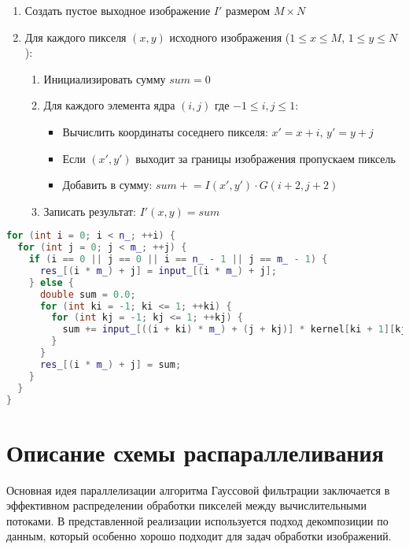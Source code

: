 \documentclass[a4paper,12pt]{article}
\begin{document}
\begin{enumerate}
    \item Создать пустое выходное изображение $I'$ размером $M \times N$
    
    \item Для каждого пикселя $(x,y)$ исходного изображения ($1 \leq x \leq M$, $1 \leq y \leq N$):
    \begin{enumerate}
        \item Инициализировать сумму $sum = 0$
        
        \item Для каждого элемента ядра $(i,j)$ где $-1 \leq i,j \leq 1$:
        \begin{itemize}
            \item Вычислить координаты соседнего пикселя: 
            $x' = x + i$, $y' = y + j$
            
            \item Если $(x',y')$ выходит за границы изображения пропускаем пиксель
            
            \item Добавить в сумму: 
            $sum \mathrel{+}= I(x',y') \cdot G(i+2,j+2)$
        \end{itemize}
        
        \item Записать результат: $I'(x,y) = sum$
    \end{enumerate}
\end{enumerate}

\begin{lstlisting}[language=C++, caption=Реализация алгоритма]
for (int i = 0; i < n_; ++i) {
  for (int j = 0; j < m_; ++j) {
    if (i == 0 || j == 0 || i == n_ - 1 || j == m_ - 1) {
      res_[(i * m_) + j] = input_[(i * m_) + j];
    } else {
      double sum = 0.0;
      for (int ki = -1; ki <= 1; ++ki) {
        for (int kj = -1; kj <= 1; ++kj) {
          sum += input_[((i + ki) * m_) + (j + kj)] * kernel[ki + 1][kj + 1];
        }
      }
      res_[(i * m_) + j] = sum;
    }
  }
}
\end{lstlisting}

\newpage
\section{Описание схемы распараллеливания}

Основная идея параллелизации алгоритма Гауссовой фильтрации заключается в эффективном распределении обработки пикселей между вычислительными потоками. В представленной реализации используется подход декомпозиции по данным, который особенно хорошо подходит для задач обработки изображений.
\end{document}
